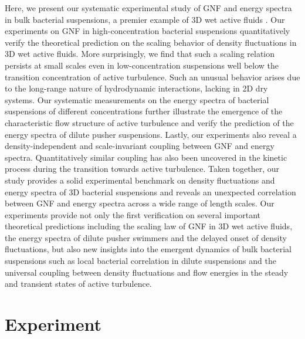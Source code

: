 \documentclass[twocolumn,aps,prx,amsmath,amssymb,longbibliography]{revtex4-2}
\begin{document}
Here, we present our systematic experimental study of GNF and energy spectra in bulk bacterial suspensions, a premier example of 3D wet active fluids \cite{Marchetti2013}. Our experiments on GNF in high-concentration bacterial suspensions quantitatively verify the theoretical prediction on the scaling behavior of density fluctuations in 3D wet active fluids. More surprisingly, we find that such a scaling relation persists at small scales even in low-concentration suspensions well below the transition concentration of active turbulence. Such an unusual behavior arises due to the long-range nature of hydrodynamic interactions, lacking in 2D dry systems. Our systematic measurements on the energy spectra of bacterial suspensions of different concentrations further illustrate the emergence of the characteristic flow structure of active turbulence and verify the prediction of the energy spectra of dilute pusher suspensions. Lastly, our experiments also reveal a density-independent and scale-invariant coupling between GNF and energy spectra. Quantitatively similar coupling has also been uncovered in the kinetic process during the transition towards active turbulence. Taken together, our study provides a solid experimental benchmark on density fluctuations and energy spectra of 3D bacterial suspensions and reveals an unexpected correlation between GNF and energy spectra across a wide range of length scales. Our experiments provide not only the first verification on several important theoretical predictions including the scaling law of GNF in 3D wet active fluids, the energy spectra of dilute pusher swimmers and the delayed onset of density fluctuations, but also new insights into the emergent dynamics of bulk bacterial suspensions such as local bacterial correlation in dilute suspensions and the universal coupling between density fluctuations and flow energies in the steady and transient states of active turbulence.

\section{Experiment}
\end{document}
